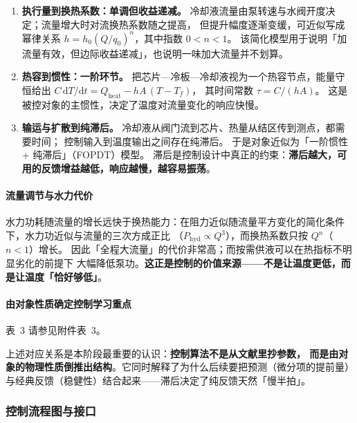 \documentclass[stage2,fontset=fandol]{ydzjreport}
\makeatletter
\newcommand{\submissionnumber}[1]{\def\@currentlabel{#1}}
\makeatother
\begin{document}
	\begin{enumerate}
		\item \textbf{执行量到换热系数：单调但收益递减。}
		冷却液流量由泵转速与水阀开度决定；流量增大时对流换热系数随之提高，
		但提升幅度逐渐变缓，可近似写成幂律关系
		$h = h_0 (Q/q_0)^n$，其中指数 $0<n<1$。
		该简化模型用于说明「加流量有效，但边际收益递减」，也说明一味加大流量并不划算。

		\item \textbf{热容到惯性：一阶环节。}
		把芯片—冷板—冷却液视为一个热容节点，能量守恒给出
		$C\,\mathrm{d}T/\mathrm{d}t = Q_{\mathrm{heat}} - hA\,(T - T_f)$，
		其时间常数 $\tau = C/(hA)$。
		这是被控对象的主惯性，决定了温度对流量变化的响应快慢。

		\item \textbf{输运与扩散到纯滞后。}
		冷却液从阀门流到芯片、热量从结区传到测点，都需要时间；
		控制输入到温度输出之间存在纯滞后。
		于是对象近似为「一阶惯性 + 纯滞后」（FOPDT）模型。
		滞后是控制设计中真正的约束：\textbf{滞后越大，可用的反馈增益越低，响应越慢，越容易振荡}。
	\end{enumerate}

	\paragraph{流量调节与水力代价}

	水力功耗随流量的增长远快于换热能力：在阻力近似随流量平方变化的简化条件下，水力功近似与流量的三次方成正比
	（$P_{\mathrm{hyd}} \propto Q^3$），而换热系数只按 $Q^n$（$n<1$）增长。
	因此「全程大流量」的代价非常高；而按需供液可以在热指标不明显劣化的前提下
	大幅降低泵功。\textbf{这正是控制的价值来源——不是让温度更低，而是让温度「恰好够低」}。

	\paragraph{由对象性质确定控制学习重点}


\par\noindent \begingroup\submissionnumber{3}\label{tab:physics-control}\endgroup 表~3 请参见附件表~3。\par


	上述对应关系是本阶段最重要的认识：\textbf{控制算法不是从文献里抄参数，
	而是由对象的物理性质倒推出结构}。它同时解释了为什么后续要把预测（微分项的提前量）
	与经典反馈（稳健性）结合起来——滞后决定了纯反馈天然「慢半拍」。

	\subsubsection{控制流程图与接口}
\end{document}
